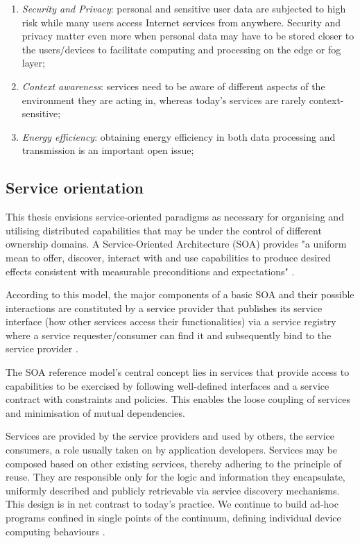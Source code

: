 \begin{enumerate}
    \item \emph{Security and Privacy}: personal and sensitive user data are subjected to high risk while many users access Internet services from anywhere. Security and privacy matter even more when personal data may have to be stored closer to the users/devices to facilitate computing and processing on the edge or fog layer;
    \item \emph{Context awareness}: services need to be aware of different aspects of the environment they are acting in, whereas today's services are rarely context-sensitive;
    \item \emph{Energy efficiency}: obtaining energy efficiency in both data processing and transmission is an important open issue;
\end{enumerate}

\subsection{Service orientation}

This thesis envisions service-oriented paradigms as necessary for organising and utilising distributed capabilities that may be under the control of different ownership domains. A Service-Oriented Architecture (SOA) provides "a uniform mean to offer, discover, interact with and use capabilities to produce desired effects consistent with measurable preconditions and expectations" \cite{mackenzie2006reference}.

According to this model, the major components of a basic SOA and their possible interactions are constituted by a service provider that publishes its service interface (how other services access their functionalities) via a service registry where a service requester/consumer can find it and subsequently bind to the service provider \cite{haller2008internet}.

The SOA reference model's central concept lies in services that provide access to capabilities to be exercised by following well-defined interfaces and a service contract with constraints and policies. This enables the loose coupling of services and minimisation of mutual dependencies.

Services are provided by the service providers and used by others, the service consumers, a role usually taken on by application developers. Services may be composed based on other existing services, thereby adhering to the principle of reuse. They are responsible only for the logic and information they encapsulate, uniformly described and publicly retrievable via service discovery mechanisms. This design is in net contrast to today's practice. We continue to build ad-hoc programs confined in single points of the continuum, defining individual device computing behaviours \cite{beckman2020harnessing}.

